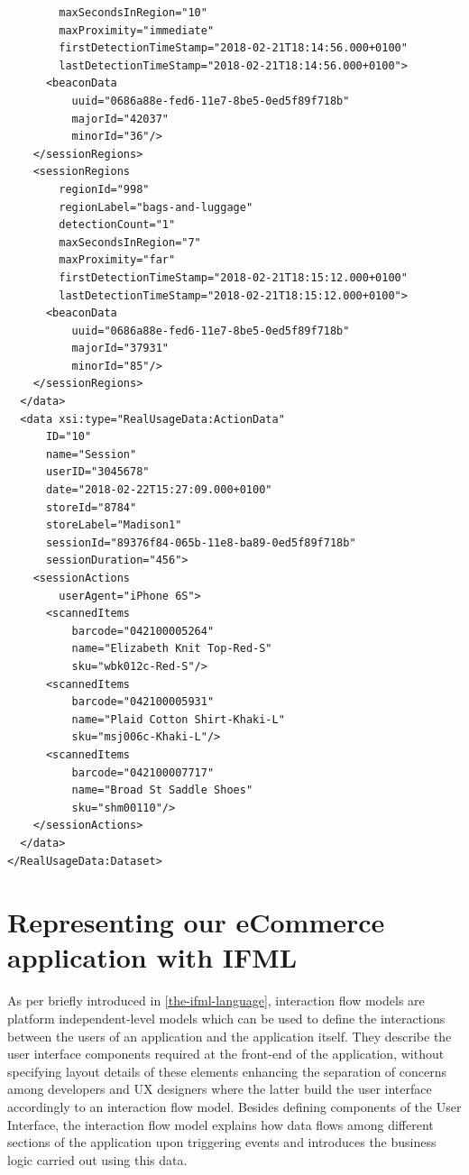 \begin{lstlisting}
        maxSecondsInRegion="10"
        maxProximity="immediate"
        firstDetectionTimeStamp="2018-02-21T18:14:56.000+0100"
        lastDetectionTimeStamp="2018-02-21T18:14:56.000+0100">
      <beaconData
          uuid="0686a88e-fed6-11e7-8be5-0ed5f89f718b"
          majorId="42037"
          minorId="36"/>
    </sessionRegions>
    <sessionRegions
        regionId="998"
        regionLabel="bags-and-luggage"
        detectionCount="1"
        maxSecondsInRegion="7"
        maxProximity="far"
        firstDetectionTimeStamp="2018-02-21T18:15:12.000+0100"
        lastDetectionTimeStamp="2018-02-21T18:15:12.000+0100">
      <beaconData
          uuid="0686a88e-fed6-11e7-8be5-0ed5f89f718b"
          majorId="37931"
          minorId="85"/>
    </sessionRegions>
  </data>
  <data xsi:type="RealUsageData:ActionData"
      ID="10"
      name="Session"
      userID="3045678"
      date="2018-02-22T15:27:09.000+0100"
      storeId="8784"
      storeLabel="Madison1"
      sessionId="89376f84-065b-11e8-ba89-0ed5f89f718b"
      sessionDuration="456">
    <sessionActions
        userAgent="iPhone 6S">
      <scannedItems
          barcode="042100005264"
          name="Elizabeth Knit Top-Red-S"
          sku="wbk012c-Red-S"/>
      <scannedItems
          barcode="042100005931"
          name="Plaid Cotton Shirt-Khaki-L"
          sku="msj006c-Khaki-L"/>
      <scannedItems
          barcode="042100007717"
          name="Broad St Saddle Shoes"
          sku="shm00110"/>
    </sessionActions>
  </data>
</RealUsageData:Dataset>
\end{lstlisting}

\section{Representing our eCommerce application with IFML}

As per briefly introduced in \ref{the-ifml-language}, interaction flow models are platform independent-level models which can be used to define the interactions between the users of an application and the application itself. They describe the user interface components required at the front-end of the
application, without specifying layout details of these elements enhancing the separation of concerns among developers and UX designers where the latter build the user interface accordingly to an interaction flow model. Besides defining components of the User Interface, the interaction flow model explains how data flows among different sections of the application upon triggering events and introduces the business logic carried out using this data.

